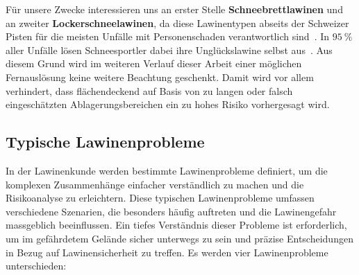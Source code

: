 Für unsere Zwecke interessieren uns an erster Stelle \textbf{Schneebrettlawinen} und an zweiter \textbf{Lockerschneelawinen}, da diese Lawinentypen abseits der Schweizer Pisten für die meisten Unfälle mit Personenschaden  verantwortlich sind~\cite{harveyrhynerschweizerlawinenkunde}.
In $\qty{95}{\percent}$ aller Unfälle lösen Schneesportler dabei ihre Unglückslawine selbst aus~\cite{ortovoxlabsnow}. Aus diesem Grund wird im weiteren Verlauf dieser Arbeit einer möglichen Fernauslösung keine weitere Beachtung geschenkt. Damit wird vor allem verhindert, dass flächendeckend auf Basis von zu langen oder falsch eingeschätzten Ablagerungsbereichen ein zu hohes Risiko vorhergesagt wird.~\cite{athmaps}

\pagebreak
\subsection{Typische Lawinenprobleme}\label{lawinenprobleme}

In der Lawinenkunde werden bestimmte Lawinenprobleme definiert, um die komplexen Zusammenhänge einfacher verständlich zu machen und die Risikoanalyse zu erleichtern. Diese typischen Lawinenprobleme umfassen verschiedene Szenarien, die besonders häufig auftreten und die Lawinengefahr massgeblich beeinflussen. Ein tiefes Verständnis dieser Probleme ist erforderlich, um im gefährdetem Gelände sicher unterwegs zu sein und präzise Entscheidungen in Bezug auf Lawinensicherheit zu treffen. Es werden vier Lawinenprobleme unterschieden:

